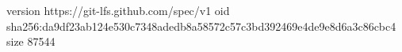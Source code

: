 version https://git-lfs.github.com/spec/v1
oid sha256:da9df23ab124e530c7348adedb8a58572c57c3bd392469e4de9e8d6a3c86cbc4
size 87544
